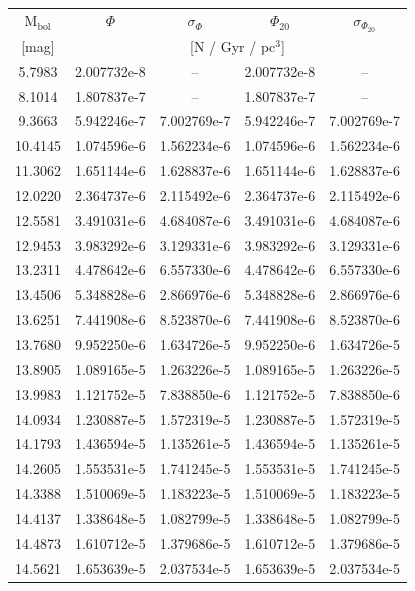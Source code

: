 \documentclass[fleqn,usenatbib]{mnras}
\begin{document}
\begin{table}
    \centering
    \begin{tabular}{c|cccc}
         M$_{\mathrm{bol}}$ & $\Phi$ & $\sigma_{\Phi}$ & $\Phi_{20}$ & $\sigma_{\Phi_{20}}$ \\
         {[mag]} & \multicolumn{4}{c}{[N / Gyr / pc$^3$]}\\\hline\hline

5.7983 & 2.007732e-8 & -- & 2.007732e-8 & --\\
8.1014 & 1.807837e-7 & -- & 1.807837e-7 & --\\
9.3663 & 5.942246e-7 & 7.002769e-7 & 5.942246e-7 & 7.002769e-7\\
10.4145 & 1.074596e-6 & 1.562234e-6 & 1.074596e-6 & 1.562234e-6\\
11.3062 & 1.651144e-6 & 1.628837e-6 & 1.651144e-6 & 1.628837e-6\\
12.0220 & 2.364737e-6 & 2.115492e-6 & 2.364737e-6 & 2.115492e-6\\
12.5581 & 3.491031e-6 & 4.684087e-6 & 3.491031e-6 & 4.684087e-6\\
12.9453 & 3.983292e-6 & 3.129331e-6 & 3.983292e-6 & 3.129331e-6\\
13.2311 & 4.478642e-6 & 6.557330e-6 & 4.478642e-6 & 6.557330e-6\\
13.4506 & 5.348828e-6 & 2.866976e-6 & 5.348828e-6 & 2.866976e-6\\\hline
13.6251 & 7.441908e-6 & 8.523870e-6 & 7.441908e-6 & 8.523870e-6\\
13.7680 & 9.952250e-6 & 1.634726e-5 & 9.952250e-6 & 1.634726e-5\\
13.8905 & 1.089165e-5 & 1.263226e-5 & 1.089165e-5 & 1.263226e-5\\
13.9983 & 1.121752e-5 & 7.838850e-6 & 1.121752e-5 & 7.838850e-6\\
14.0934 & 1.230887e-5 & 1.572319e-5 & 1.230887e-5 & 1.572319e-5\\
14.1793 & 1.436594e-5 & 1.135261e-5 & 1.436594e-5 & 1.135261e-5\\
14.2605 & 1.553531e-5 & 1.741245e-5 & 1.553531e-5 & 1.741245e-5\\
14.3388 & 1.510069e-5 & 1.183223e-5 & 1.510069e-5 & 1.183223e-5\\
14.4137 & 1.338648e-5 & 1.082799e-5 & 1.338648e-5 & 1.082799e-5\\
14.4873 & 1.610712e-5 & 1.379686e-5 & 1.610712e-5 & 1.379686e-5\\\hline
14.5621 & 1.653639e-5 & 2.037534e-5 & 1.653639e-5 & 2.037534e-5\\

\end{tabular}
\end{table}
\end{document}
